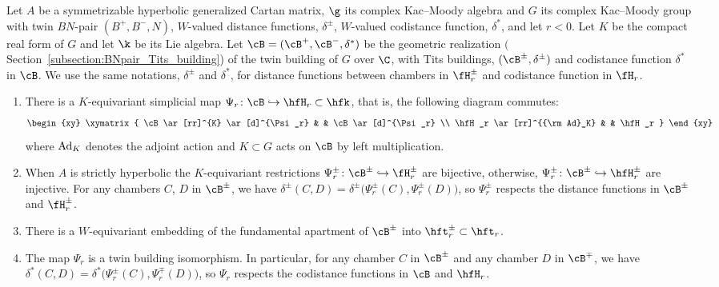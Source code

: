 \begin{Theorem}\label{theorem:mainembedding theorem}Let $A$ be a symmetrizable hyperbolic generalized Cartan matrix, $\g$ its complex Kac--Moody algebra and $G$ its complex Kac--Moody group with twin $BN$-pair $(B^+,B^-,N)$, $W$-valued distance functions, $\delta^\pm$, $W$-valued codistance function, $\delta^*$, and let $r < 0$. Let $K$ be the compact real form of $G$ and let $\k$ be its Lie algebra. Let $\cB=(\cB^+, \cB^-,\delta^*)$ be the geometric realization $($Section~{\rm \ref{subsection:BNpair_Tits_building})} of the twin building of $G$ over $\C$, with Tits buildings, $(\cB^\pm,\delta^\pm)$ and codistance function $\delta^*$ in $\cB$. We use the same notations, $\delta^\pm$ and $\delta^*$, for distance functions between chambers in $\fH_r^\pm$ and codistance function in $\fH_r$.
\begin{enumerate}\itemsep=0pt
\item[$1.$] There is a $K$-equivariant simplicial map
$\Psi_r\colon \cB\hookrightarrow \hfH_r\subset \hfk$, that is, the following diagram commutes:
 \begin{displaymath}
 \begin{xy}
 \xymatrix{
 \cB \ar[rr]^{K} \ar[d]^{\Psi_r} & & \cB \ar[d]^{\Psi_r} \\
 \hfH_r \ar[rr]^{{\rm Ad}_K} & & \hfH_r
 }
 \end{xy}
 \end{displaymath}
where ${\rm Ad}_K$ denotes the adjoint action and $K\subset G$ acts on $\cB$ by left multiplication.
\item[$2.$] When $A$ is strictly hyperbolic the $K$-equivariant restrictions $\Psi_r^\pm\colon \cB^\pm\hookrightarrow \fH_r^\pm$ are bijective, otherwise, $\Psi_r^\pm\colon \cB^\pm\hookrightarrow \hfH_r^\pm$ are injective. For any chambers $C$, $D$ in $\cB^\pm$, we have $\delta^\pm(C,D) = \delta^\pm\big(\Psi_r^\pm(C), \Psi_r^\pm(D)\big)$, so $\Psi_r^\pm$ respects the distance functions
in $\cB^\pm$ and $\fH_r^\pm$.
\item[$3.$] There is a $W$-equivariant embedding of the fundamental apartment of $\cB^\pm$ into
$\hft^\pm_r\subset\hft_r$.
\item[$4.$] The map $\Psi_r$ is a twin building isomorphism. In particular, for any chamber $C$ in
$\cB^\pm$ and any chamber $D$ in $\cB^\mp$, we have $\delta^*(C,D) = \delta^*\big(\Psi_r^\pm(C), \Psi_r^\mp(D)\big)$, so $\Psi_r$ respects the codistance functions in $\cB$ and $\hfH_r$.
\end{enumerate}
\end{Theorem}

